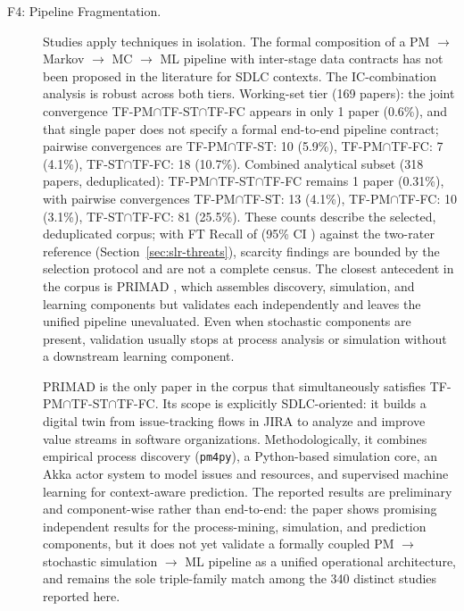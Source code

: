 \begin{description}
\item[F4: Pipeline Fragmentation.]
Studies apply techniques in isolation. The formal composition of a
PM $\rightarrow$ Markov $\rightarrow$ MC $\rightarrow$ ML pipeline with
inter-stage data contracts has not been proposed in the literature for SDLC
contexts. The IC-combination analysis is robust across both tiers.
Working-set tier (169 papers): the joint convergence
TF-PM$\cap$TF-ST$\cap$TF-FC appears in only 1 paper (0.6\%), and that single
paper does not specify a formal end-to-end pipeline contract; pairwise
convergences are TF-PM$\cap$TF-ST: 10 (5.9\%), TF-PM$\cap$TF-FC: 7 (4.1\%),
TF-ST$\cap$TF-FC: 18 (10.7\%). Combined analytical subset (318 papers,
deduplicated): TF-PM$\cap$TF-ST$\cap$TF-FC remains 1 paper (0.31\%), with pairwise
convergences TF-PM$\cap$TF-ST: 13 (4.1\%), TF-PM$\cap$TF-FC: 10 (3.1\%),
TF-ST$\cap$TF-FC: 81 (25.5\%). These counts describe the selected,
deduplicated corpus; with FT Recall of  (95\% CI )
against the two-rater reference (Section~\ref{sec:slr-threats}), scarcity
findings are bounded by the selection protocol and are not a complete
census.
The closest antecedent
in the corpus is PRIMAD \cite{guinea2025}, which assembles discovery,
simulation, and learning components but validates each independently and
leaves the unified pipeline unevaluated. Even when stochastic components are
present, validation usually stops at process analysis or simulation without
a downstream learning component.

PRIMAD is the only paper in the corpus that simultaneously satisfies
TF-PM$\cap$TF-ST$\cap$TF-FC. Its scope is explicitly SDLC-oriented: it builds a
digital twin from issue-tracking flows in JIRA to analyze and improve value
streams in software organizations. Methodologically, it combines empirical
process discovery (\texttt{pm4py}), a Python-based simulation core, an Akka
actor system to model issues and resources, and supervised machine learning
for context-aware prediction. The reported results are preliminary and
component-wise rather than end-to-end: the paper shows promising independent
results for the process-mining, simulation, and prediction components, but it
does not yet validate a formally coupled PM $\rightarrow$ stochastic
simulation $\rightarrow$ ML pipeline as a unified operational architecture,
and remains the sole triple-family match among the 340 distinct studies
reported here.


\end{description}
